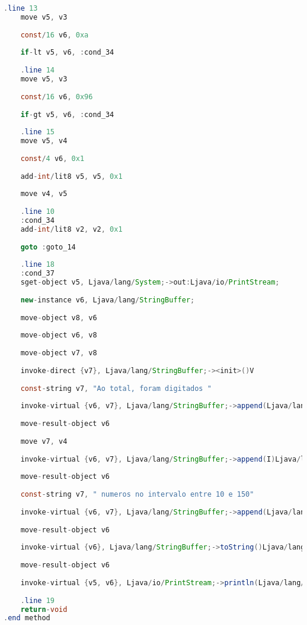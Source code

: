 \documentclass[hidelinks,12pt]{article}
\begin{document}
\begin{lstlisting}[caption=Smali resultante do .java,language=java]
	.line 13
	move v5, v3
	
	const/16 v6, 0xa
	
	if-lt v5, v6, :cond_34
	
	.line 14
	move v5, v3
	
	const/16 v6, 0x96
	
	if-gt v5, v6, :cond_34
	
	.line 15
	move v5, v4
	
	const/4 v6, 0x1
	
	add-int/lit8 v5, v5, 0x1
	
	move v4, v5
	
	.line 10
	:cond_34
	add-int/lit8 v2, v2, 0x1
	
	goto :goto_14
	
	.line 18
	:cond_37
	sget-object v5, Ljava/lang/System;->out:Ljava/io/PrintStream;
	
	new-instance v6, Ljava/lang/StringBuffer;
	
	move-object v8, v6
	
	move-object v6, v8
	
	move-object v7, v8
	
	invoke-direct {v7}, Ljava/lang/StringBuffer;-><init>()V
	
	const-string v7, "Ao total, foram digitados "
	
	invoke-virtual {v6, v7}, Ljava/lang/StringBuffer;->append(Ljava/lang/String;)Ljava/lang/StringBuffer;
	
	move-result-object v6
	
	move v7, v4
	
	invoke-virtual {v6, v7}, Ljava/lang/StringBuffer;->append(I)Ljava/lang/StringBuffer;
	
	move-result-object v6
	
	const-string v7, " numeros no intervalo entre 10 e 150"
	
	invoke-virtual {v6, v7}, Ljava/lang/StringBuffer;->append(Ljava/lang/String;)Ljava/lang/StringBuffer;
	
	move-result-object v6
	
	invoke-virtual {v6}, Ljava/lang/StringBuffer;->toString()Ljava/lang/String;
	
	move-result-object v6
	
	invoke-virtual {v5, v6}, Ljava/io/PrintStream;->println(Ljava/lang/String;)V
	
	.line 19
	return-void
.end method	
	
	\end{lstlisting}
	
\end{document}
